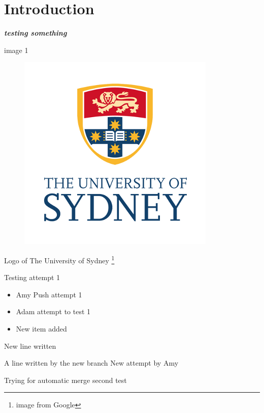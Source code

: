 \documentclass[10pt]{article}
\newcommand{\boldit}[1]{\textbf{\textit{#1}}}
\begin{document}
\section{\textsf{Introduction}}
\boldit{testing something}

image 1 
\begin{figure}[hbt!]
  \centering
  \includegraphics{usyd logo}
\end{figure}
Logo of The University of Sydney \footnote{image from Google}

Testing attempt 1
\begin{itemize}
  \item Amy Push attempt 1
  \item Adam attempt to test 1
  \item New item added
\end{itemize}
New line written

A line written by the new branch
New attempt by Amy

Trying for automatic merge
second test
\end{document}
